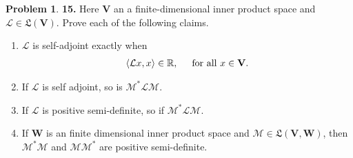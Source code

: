 \documentclass{book}
\theoremstyle{definition}
\newtheorem*{prob*}{Problem}
\newcommand{\R}{\mathbb{R}}
\newcommand{\V}{\mathbf{V}}
\newcommand{\W}{\mathbf{W}}
\newcommand{\lag}{\mathcal{L}}
\newcommand{\M}{\mathcal{M}}
\newcommand{\LL}{\mathfrak{L}}
\newcommand{\la}{\langle}
\newcommand{\ra}{\rangle}
\begin{document}
\newpage
































\begin{prob*}\textbf{15.} Here $\V$ an a finite-dimensional inner product space and $\lag \in \LL(\V)$. Prove each of the following claims.
	\begin{enumerate}
		\item $\lag$ is self-adjoint exactly when
		\begin{align*}
		\la \lag x,x \ra \in \R, \hspace{0.5cm} \text{for all $x \in \V$}.
		\end{align*}
		
		\item If $\lag$ is self adjoint, so is $\M^* \lag \M$.
		
		\item If $\lag$ is positive semi-definite, so if $\M^* \lag \M$.
		
		
		\item If $\W$ is an finite dimensional inner product space and $\M \in \LL(\V,\W)$, then $\M^*\M$ and $\M\M^*$ are positive semi-definite. 
	\end{enumerate}
	
\end{prob*}






\newpage
\end{document}
